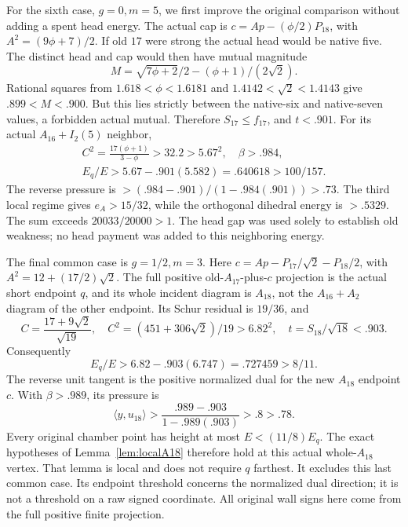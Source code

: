 \documentclass[11pt]{article}
\theoremstyle{definition}
\theoremstyle{remark}
\newcommand{\ip}[2]{\langle #1,#2\rangle}
\begin{document}
For the sixth case, \(g=0,m=5\), we first improve the original
comparison without adding a spent head energy.
The actual cap is \(c=Ap-(\phi/2)P_{18}\), with
\(A^2=(9\phi+7)/2\).
If old \(17\) were strong the actual head would be native five.
The distinct head and cap would then have mutual magnitude
\[
 M=\sqrt{7\phi+2}/2-(\phi+1)/(2\sqrt2).
\]
Rational squares from \(1.618<\phi<1.6181\) and
\(1.4142<\sqrt2<1.4143\) give \(.899<M<.900\).
But this lies strictly between the native-six and native-seven
values, a forbidden actual mutual.
Therefore \(S_{17}\leq f_{17}\), and \(t<.901\).
For its actual \(A_{16}+I_2(5)\) neighbor,
\[
\begin{gathered}
 C^2=\frac{17(\phi+1)}{3-\phi}>32.2>5.67^2,\quad \beta>.984,\\
 E_q/E>5.67-.901(5.582)=.640618>100/157 .
\end{gathered}
\]
The reverse pressure is
\(>(.984-.901)/(1-.984(.901))>.73\).
The third local regime gives \(e_A>15/32\), while the
orthogonal dihedral energy is \(>.5329\).
The sum exceeds \(20033/20000>1\).
The head gap was used solely to establish old weakness; no
head payment was added to this neighboring energy.

The final common case is \(g=1/2,m=3\).
Here \(c=Ap-P_{17}/\sqrt2-P_{18}/2\), with
\(A^2=12+(17/2)\sqrt2\).
The full positive old-\(A_{17}\)-plus-\(c\) projection is the
actual short endpoint \(q\), and its whole incident diagram is
\(A_{18}\), not the \(A_{16}+A_2\) diagram of the other endpoint.
Its Schur residual is \(19/36\), and
\[
 C=\frac{17+9\sqrt2}{\sqrt{19}},\quad
 C^2=(451+306\sqrt2)/19>6.82^2,\quad
 t=S_{18}/\sqrt{18}<.903 .
\]
Consequently
\[
 E_q/E>6.82-.903(6.747)=.727459>8/11 .
\]
The reverse unit tangent is the positive normalized dual for the
new \(A_{18}\) endpoint \(c\). With \(\beta>.989\),
its pressure is
\[
 \ip{y}{u_{18}}
 >\frac{.989-.903}{1-.989(.903)}>.8>.78 .
\]
Every original chamber point has height at most \(E<(11/8)E_q\).
The exact hypotheses of Lemma~\ref{lem:localA18} therefore hold
at this actual whole-\(A_{18}\) vertex.
That lemma is local and does not require \(q\) farthest.
It excludes this last common case. Its endpoint threshold concerns
the normalized dual direction; it is not a threshold on a raw
signed coordinate. All original wall signs here come from the
full positive finite projection.
\end{document}
